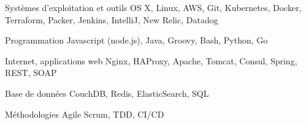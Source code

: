 
\begin{cvskills}

  \cvskill
    {Systèmes d'exploitation et outils} %
    {OS X, Linux, AWS, Git, Kubernetes, Docker, Terraform, Packer, Jenkins, IntelliJ, New Relic, Datadog} %

  \cvskill
    {Programmation} %
    {Javascript (node.js), Java, Groovy, Bash, Python, Go} %

  \cvskill
    {Internet, applications web} %
    {Nginx, HAProxy, Apache, Tomcat, Consul, Spring, REST, SOAP} %

  \cvskill
    {Base de données} %
    {CouchDB, Redis, ElasticSearch, SQL} %

  \cvskill
    {Méthodologies} %
    {Agile Scrum, TDD, CI/CD} %

\end{cvskills}